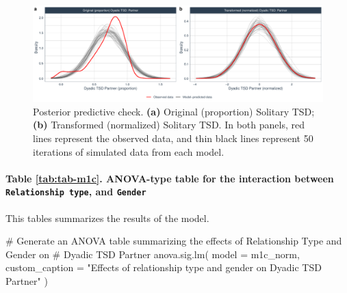 \documentclass[
  bookmarksnumbered]{article}
\newenvironment{Shaded}{\begin{snugshade}}{\end{snugshade}}
\newcommand{\AttributeTok}[1]{\textcolor[rgb]{0.80,0.80,0.80}{#1}}
\newcommand{\CommentTok}[1]{\textcolor[rgb]{0.50,0.62,0.50}{#1}}
\newcommand{\FunctionTok}[1]{\textcolor[rgb]{0.94,0.94,0.56}{#1}}
\newcommand{\NormalTok}[1]{\textcolor[rgb]{0.80,0.80,0.80}{#1}}
\newcommand{\StringTok}[1]{\textcolor[rgb]{0.80,0.58,0.58}{#1}}
\begin{document}
\begin{figure}
\centering
\includegraphics{Sexual_Desire_Arousal_files/figure-latex/ppc-m1c-1.pdf}
\caption{\label{fig:ppc-m1c}Posterior predictive check. \textbf{(a)} Original (proportion) Solitary TSD; \textbf{(b)} Transformed (normalized) Solitary TSD. In both panels, red lines represent the observed data, and thin black lines represent 50 iterations of simulated data from each model.}
\end{figure}

\paragraph{\texorpdfstring{Table \ref{tab:tab-m1c}. ANOVA-type table for the interaction between \texttt{Relationship\ type}, and \texttt{Gender}}{Table \ref{tab:tab-m1c}. ANOVA-type table for the interaction between Relationship type, and Gender}}\label{table-reftabtab-m1c.-anova-type-table-for-the-interaction-between-relationship-type-and-gender}

This tables summarizes the results of the model.

\begin{Shaded}
\begin{Highlighting}[]
\CommentTok{\# Generate an ANOVA table summarizing the effects of Relationship Type and Gender on}
\CommentTok{\# Dyadic TSD Partner}
\FunctionTok{anova.sig.lm}\NormalTok{(}
  \AttributeTok{model =}\NormalTok{ m1c\_norm,}
  \AttributeTok{custom\_caption =} \StringTok{"Effects of relationship type and gender on Dyadic TSD Partner"}
\NormalTok{)}
\end{Highlighting}
\end{Shaded}
\end{document}
